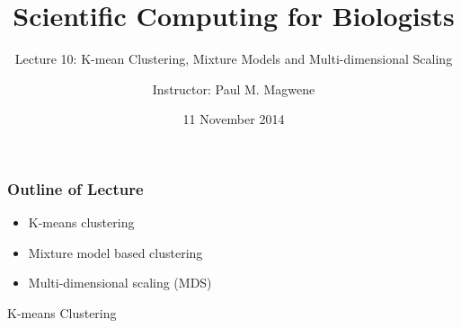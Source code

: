 \documentclass{beamer}
\title{Scientific Computing for Biologists}
\subtitle{Lecture 10: K-mean Clustering, Mixture Models and Multi-dimensional Scaling} %
\author{Instructor: Paul M. Magwene}
\date{11  November 2014}
\begin{document}
\begin{frame}
\titlepage
\end{frame}


\begin{frame}
  \frametitle{Outline of Lecture}

\begin{itemize}
    \item K-means clustering
    \item Mixture model based clustering
    \item Multi-dimensional scaling (MDS)
\end{itemize}

\end{frame}

\begin{frame}[plain,c]
\begin{center}
\Huge K-means Clustering
\end{center}
\end{frame}

\end{document}
